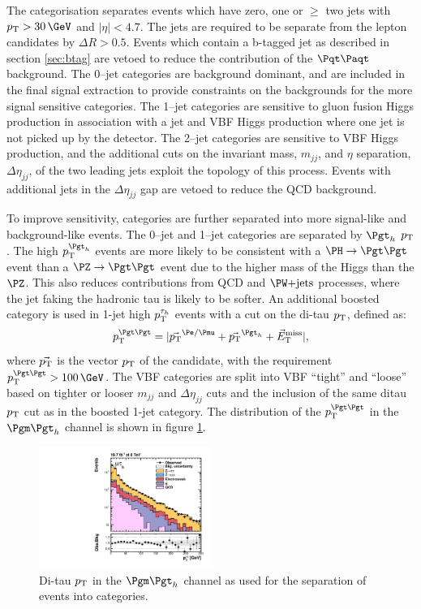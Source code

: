 The categorisation separates events which have zero, one or $\geq$ two jets with
$\pt > 30\,\GeV$
and $|\eta| < 4.7$. The jets are required to be separate from the lepton
candidates by $\Delta R > 0.5$. Events which contain a b-tagged jet as described in section
\ref{sec:btag} are vetoed to reduce the contribution of the $\ttbar$ background. 
The 0--jet categories are background dominant, and are included in the final
signal extraction to provide constraints on the backgrounds for the more signal
sensitive categories. The 1--jet categories are sensitive to gluon fusion Higgs
production in association with a jet and \ac{VBF} Higgs production where one jet is
not picked up by the detector. The 2--jet categories are sensitive to
\ac{VBF} Higgs production, and the additional cuts on the invariant mass, $m_{jj}$,
and $\eta$ separation, $\Delta\eta_{jj}$, of the two leading
jets exploit the topology of this process. Events with additional jets in
the $\Delta \eta_{jj}$ gap are vetoed to reduce the QCD background.

To improve sensitivity, categories are further separated into more signal-like
and background-like events. The 0--jet and 1--jet categories are separated by
$\Pgth$ $p_{\mathrm{T}}$. The high $\pt^{\Pgth}$ events are more likely to be
consistent with a $\HToTauTau$ event than a $\ZToTauTau$ event due to the higher
mass of the Higgs than the $\PZ$. This also reduces contributions from QCD
and $\WJets$ processes, where the jet faking the hadronic tau is likely to be
softer. An additional boosted category is used in 1-jet high $p_{\mathrm{T}}^{\tau_{h}}$
events with a cut on the di-tau $p_{\mathrm{T}}$, defined as:
\begin{equation}
\pt^{\Pgt\Pgt} = |\vec{\pt}^{\Pe/\Pmu} + \vec{\pt}^{\Pgth}+\vecMET|,
\end{equation}
where $\vec{p_{\mathrm{T}}}$ is the vector $p_{\mathrm{T}}$ of the candidate, with the requirement 
$\pt^{\Pgt\Pgt}>100\,\GeV$. The VBF categories are split into VBF
``tight'' and ``loose'' based on tighter or looser $m_{jj}$ and
$\Delta\eta_{jj}$ cuts and the inclusion of the same ditau $p_{\mathrm{T}}$ cut as in the
boosted 1-jet category. The distribution of the $\pt^{\Pgt\Pgt}$ in the
$\mutau$ channel is shown in figure \ref{fig:ditaupt}. 

\begin{figure}[htb]
\begin{center}
    \includegraphics[width=0.5\textwidth]
      {plots/htt-sm/pt_tt_inclusive_mt_2012_log.pdf}
\end{center}
\caption{
 Di-tau $p_{\mathrm{T}}$ in the $\mutau$ channel as used for the separation of events into
 categories. 
}
\label{fig:ditaupt}
\end{figure}

